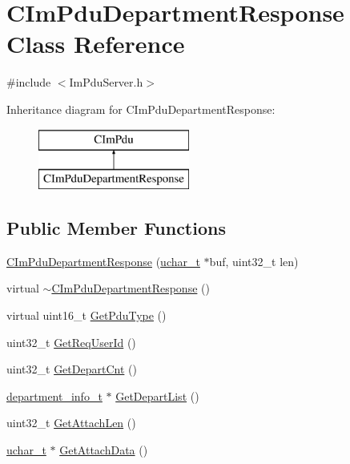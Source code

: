 \hypertarget{class_c_im_pdu_department_response}{}\section{C\+Im\+Pdu\+Department\+Response Class Reference}
\label{class_c_im_pdu_department_response}


{\ttfamily \#include $<$Im\+Pdu\+Server.\+h$>$}

Inheritance diagram for C\+Im\+Pdu\+Department\+Response\+:\begin{figure}[H]
\begin{center}
\leavevmode
\includegraphics[height=2.000000cm]{class_c_im_pdu_department_response}
\end{center}
\end{figure}
\subsection*{Public Member Functions}
\begin{DoxyCompactItemize}
\item 
\hyperlink{class_c_im_pdu_department_response_abde1bb3914a2762de5c6e131a95c931f}{C\+Im\+Pdu\+Department\+Response} (\hyperlink{base_2ostype_8h_a124ea0f8f4a23a0a286b5582137f0b8d}{uchar\+\_\+t} $\ast$buf, uint32\+\_\+t len)
\item 
virtual \hyperlink{class_c_im_pdu_department_response_aaebff57b2c9efd58caab1c1b9beb39c5}{$\sim$\+C\+Im\+Pdu\+Department\+Response} ()
\item 
virtual uint16\+\_\+t \hyperlink{class_c_im_pdu_department_response_a149d29ec3016fa345db52daae0018573}{Get\+Pdu\+Type} ()
\item 
uint32\+\_\+t \hyperlink{class_c_im_pdu_department_response_ac2f63b9b83cdd1e9f3fa9101b500cff7}{Get\+Req\+User\+Id} ()
\item 
uint32\+\_\+t \hyperlink{class_c_im_pdu_department_response_a30079c2bdc2285241a8c9ac8e078ddcf}{Get\+Depart\+Cnt} ()
\item 
\hyperlink{structdepartment__info__t}{department\+\_\+info\+\_\+t} $\ast$ \hyperlink{class_c_im_pdu_department_response_a1da3a84eb53fe59627556f9fe0d92482}{Get\+Depart\+List} ()
\item 
uint32\+\_\+t \hyperlink{class_c_im_pdu_department_response_afc1747c5f095b4efcca4db4c918413e3}{Get\+Attach\+Len} ()
\item 
\hyperlink{base_2ostype_8h_a124ea0f8f4a23a0a286b5582137f0b8d}{uchar\+\_\+t} $\ast$ \hyperlink{class_c_im_pdu_department_response_a95424ee1b05650e68b4cc2b1eb9d35a3}{Get\+Attach\+Data} ()
\end{DoxyCompactItemize}
